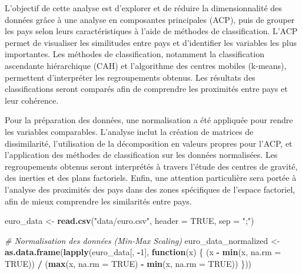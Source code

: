 \documentclass[
]{article}
\newenvironment{Shaded}{\begin{snugshade}}{\end{snugshade}}
\newcommand{\AttributeTok}[1]{\textcolor[rgb]{0.13,0.29,0.53}{#1}}
\newcommand{\CommentTok}[1]{\textcolor[rgb]{0.56,0.35,0.01}{\textit{#1}}}
\newcommand{\ConstantTok}[1]{\textcolor[rgb]{0.56,0.35,0.01}{#1}}
\newcommand{\ControlFlowTok}[1]{\textcolor[rgb]{0.13,0.29,0.53}{\textbf{#1}}}
\newcommand{\DecValTok}[1]{\textcolor[rgb]{0.00,0.00,0.81}{#1}}
\newcommand{\FunctionTok}[1]{\textcolor[rgb]{0.13,0.29,0.53}{\textbf{#1}}}
\newcommand{\NormalTok}[1]{#1}
\newcommand{\OtherTok}[1]{\textcolor[rgb]{0.56,0.35,0.01}{#1}}
\newcommand{\SpecialCharTok}[1]{\textcolor[rgb]{0.81,0.36,0.00}{\textbf{#1}}}
\newcommand{\StringTok}[1]{\textcolor[rgb]{0.31,0.60,0.02}{#1}}
\begin{document}
L'objectif de cette analyse est d'explorer et de réduire la
dimensionnalité des données grâce à une analyse en composantes
principales (ACP), puis de grouper les pays selon leurs caractéristiques
à l'aide de méthodes de classification. L'ACP permet de visualiser les
similitudes entre pays et d'identifier les variables les plus
importantes. Les méthodes de classification, notamment la classification
ascendante hiérarchique (CAH) et l'algorithme des centres mobiles
(k-means), permettent d'interpréter les regroupements obtenus. Les
résultats des classifications seront comparés afin de comprendre les
proximités entre pays et leur cohérence.

Pour la préparation des données, une normalisation a été appliquée pour
rendre les variables comparables. L'analyse inclut la création de
matrices de dissimilarité, l'utilisation de la décomposition en valeurs
propres pour l'ACP, et l'application des méthodes de classification sur
les données normalisées. Les regroupements obtenus seront interprétés à
travers l'étude des centres de gravité, des inerties et des plans
factoriels. Enfin, une attention particulière sera portée à l'analyse
des proximités des pays dans des zones spécifiques de l'espace
factoriel, afin de mieux comprendre les similarités entre pays.

\begin{Shaded}
\begin{Highlighting}[]
\NormalTok{euro\_data }\OtherTok{\textless{}{-}} \FunctionTok{read.csv}\NormalTok{(}\StringTok{"data/euro.csv"}\NormalTok{, }\AttributeTok{header =} \ConstantTok{TRUE}\NormalTok{, }\AttributeTok{sep =} \StringTok{";"}\NormalTok{)}

\CommentTok{\# Normalisation des données (Min{-}Max Scaling)}
\NormalTok{euro\_data\_normalized }\OtherTok{\textless{}{-}} \FunctionTok{as.data.frame}\NormalTok{(}\FunctionTok{lapply}\NormalTok{(euro\_data[, }\SpecialCharTok{{-}}\DecValTok{1}\NormalTok{], }\ControlFlowTok{function}\NormalTok{(x) \{}
\NormalTok{  (x }\SpecialCharTok{{-}} \FunctionTok{min}\NormalTok{(x, }\AttributeTok{na.rm =} \ConstantTok{TRUE}\NormalTok{)) }\SpecialCharTok{/}\NormalTok{ (}\FunctionTok{max}\NormalTok{(x, }\AttributeTok{na.rm =} \ConstantTok{TRUE}\NormalTok{) }\SpecialCharTok{{-}} \FunctionTok{min}\NormalTok{(x, }\AttributeTok{na.rm =} \ConstantTok{TRUE}\NormalTok{))}
\NormalTok{\}))}
\end{Highlighting}
\end{Shaded}
\end{document}
